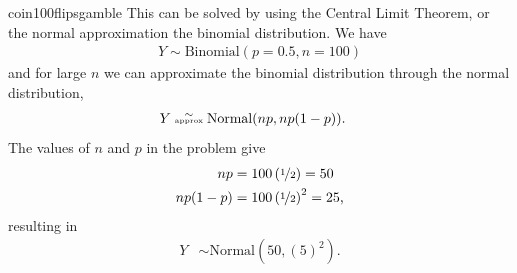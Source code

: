 \begin{answer}{coin100flipsgamble}
This can be solved by using the Central Limit Theorem, or the normal approximation the binomial distribution.
We have
\begin{align*}
  Y \sim \text{Binomial}(p=0.5, n=100)
\end{align*}
and for large $n$ we can approximate the binomial distribution through the normal distribution, \begin{align*}
  Y &\stackrel{\sim}{\text{\tiny approx}}  \text{Normal}(np, np(1-p))
  \text{.}
\end{align*}
The values of $n$ and $p$ in the problem give
\begin{align*}
  np      &= 100\left(\nicefrac{1}{2}\right)    = 50\\
  np(1-p) &= 100\left(\nicefrac{1}{2}\right)^2  = 25
  \text{,}
\end{align*}
resulting in
\begin{align*}
  Y & \sim
  \text{Normal}\left( 50, (5)^2 \right)
  \text{.}
\end{align*}


\end{answer}
